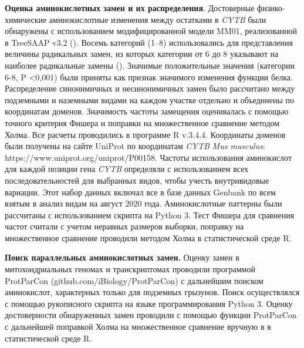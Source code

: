 \textbf{Оценка аминокислотных замен и их распределения}. Достоверные физико-химические аминокислотные изменения между остатками в \textit{CYTB} были обнаружены с использованием модифицированной модели MM01, реализованной в TreeSAAP v3.2 (\cite{Woolley2003}). Восемь категорий (1–8) использовались для представления величины радикальных замен, из которых категории от 6 до 8 указывают на наиболее радикальные замены (\cite{McClellan2001}). Значимые положительные значения (категории 6-8, P <0,001) были приняты как признак значимого изменения функции белка. Распределение синонимичных и несинонимичных замен было рассчитано между подземными и наземными видами на каждом участке отдельно и объединены по координатам доменов. Значимость частоты замещения оценивалась с помощью точного критерия Фишера и поправки на множественное сравнение методом Холма. Все расчеты проводились в программе R v.3.4.4. Координаты доменов были получены на сайте UniProt по координатам \textit{CYTB} \textit{Mus musculus}: https://www.uniprot.org/uniprot/P00158. Частоты использования аминокислот для каждой позиции гена \textit{CYTB} определяли с использованием всех последовательностей для выбранных видов, чтобы учесть внутривидовые вариации. Этот набор данных включал все в базе данных Genbank по всем взятым в анализ видам на август 2020 года. Аминокислотные паттерны были рассчитаны с использованием скрипта на Python 3. Тест Фишера для сравнения частот считали с учетом неравных размеров выборки, поправку на множественное сравнение проводили методом Холма в статистической среде R.

\textbf{Поиск параллельных аминокислотных замен.} Оценку замен в митохондриальных геномах и транскриптомах проводили программой ProtParCon (github.com/iBiology/ProtParCon) с дальнейшим поиском аминокислот, характерных только для подземных грызунов. Поиск осуществлялся с помощью рукописного скрипта на языке программирования Python 3. Оценку достоверности обнаруженных замен проводили с помощью функции ProtParCon с дальнейшей поправкой Холма на множественное сравнение вручную в в статистической среде R. 


